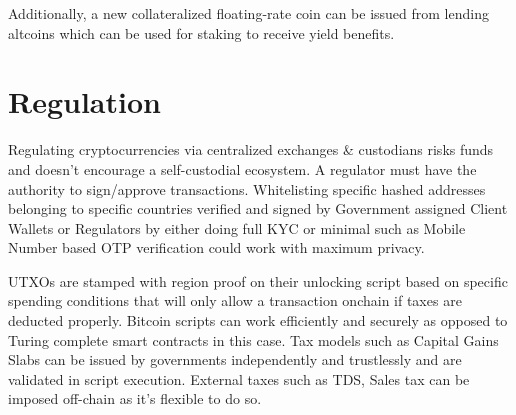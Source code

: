 \documentclass[a4paper,10pt]{article}
\begin{document}
Additionally, a new collateralized floating-rate coin can be issued from lending altcoins which can be used for staking to receive yield benefits.
\section{Regulation}
Regulating cryptocurrencies via centralized exchanges \& custodians risks funds and doesn't encourage a self-custodial ecosystem. A regulator must have the authority to sign/approve transactions. Whitelisting specific hashed addresses belonging to specific countries verified and signed by Government assigned Client Wallets or Regulators by either doing full KYC or minimal such as Mobile Number based OTP verification could work with maximum privacy.

 UTXOs are stamped with region proof on their unlocking script based on specific spending conditions that will only allow a transaction onchain if taxes are deducted properly. Bitcoin scripts can work efficiently and securely as opposed to Turing complete smart contracts in this case. Tax models such as Capital Gains Slabs can be issued by governments independently and trustlessly and are validated in script execution. External taxes such as TDS, Sales tax can be imposed off-chain as it's flexible to do so.
\end{document}
